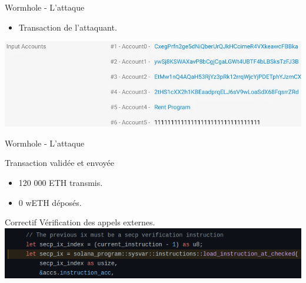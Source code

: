 \begin{frame}{Wormhole - L'attaque}
    \begin{itemize}
        \item Transaction de l'attaquant.
    \end{itemize}
        \centering
        \includegraphics[scale = 0.45]{centralisation/img/wormhole/sysvar_transaction_hack.png}
\end{frame}

\begin{frame}{Wormhole - L'attaque}
    \begin{block}{Transaction validée et envoyée}
        \begin{itemize}
            \item 120 000 ETH transmis.
            \item 0 wETH déposés.
        \end{itemize}
    \end{block}
    \begin{block}{Correctif}
        Vérification des appels externes.\\
        \centering
        \includegraphics[scale = 0.5]{centralisation/img/wormhole/worm_fixed.png}
    \end{block}
\end{frame}

